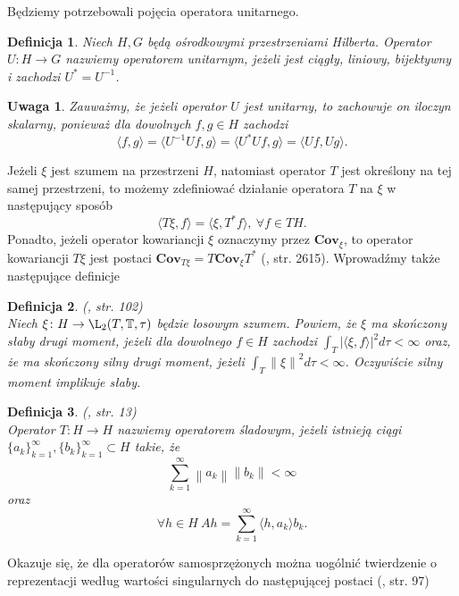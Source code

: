 \documentclass{mwart}
\newtheorem{df}{Definicja}
\newtheorem{uw}{Uwaga}
\newcommand{\norm}[1]{\left\lVert#1\right\rVert}
\begin{document}
Będziemy potrzebowali pojęcia operatora unitarnego.
\begin{df}
Niech $H,G$ będą ośrodkowymi przestrzeniami Hilberta. Operator $U\colon H\to G$ nazwiemy operatorem unitarnym, jeżeli jest ciągły, liniowy, bijektywny i zachodzi $U^*=U^{-1}$.
\end{df}
\begin{uw}
Zauważmy, że jeżeli operator $U$ jest unitarny, to zachowuje on iloczyn skalarny, ponieważ dla dowolnych $f,g\in H$ zachodzi
\begin{displaymath}
\langle f,g\rangle =\langle U^{-1}Uf,g\rangle =\langle U^*Uf,g\rangle =\langle Uf,Ug\rangle.
\end{displaymath}
\end{uw}
Jeżeli $\xi$ jest szumem na przestrzeni $H$, natomiast operator $T$ jest określony na tej samej przestrzeni, to możemy zdefiniować działanie operatora $T$ na $\xi$ w następujący sposób
\begin{displaymath}
\langle T\xi , f\rangle=\langle \xi, T^* f\rangle,\ \forall f\in TH.
\end{displaymath}
Ponadto, jeżeli operator kowariancji $\xi$ oznaczymy przez $\textbf{Cov}_{\xi}$, to operator kowariancji $T\xi$ jest postaci $\textbf{Cov}_{T\xi}=T\textbf{Cov}_{\xi}T^*$ (\cite{bissantz}, str. 2615). Wprowadźmy także następujące definicje
\begin{df}(\cite{typek}, str. 102)\\
Niech $\xi\colon H\to \L_2(T,\mathbb{T},\tau)$ będzie losowym szumem. Powiem, że $\xi$ ma skończony słaby drugi moment, jeżeli dla dowolnego $f\in H$ zachodzi $\int_T |\langle \xi, f\rangle |^2d\tau <\infty$ oraz, że ma skończony silny drugi moment, jeżeli $\int_T\norm{\xi}^2d\tau<\infty$. Oczywiście silny moment implikuje słaby.
\end{df}
\begin{df}(\cite{beska}, str. 13)\\
Operator $T\colon H\to H$  nazwiemy operatorem śladowym, jeżeli istnieją ciągi $\{a_k\}_{k=1}^{\infty},\{b_k\}_{k=1}^{\infty}\subset H$ takie, że
\begin{displaymath}
\sum_{k=1}^{\infty}\norm{a_k}\norm{b_k}<\infty
\end{displaymath}
oraz 
\begin{displaymath}
\forall h\in H\ Ah=\sum_{k=1}^{\infty}\langle h,a_k\rangle b_k.
\end{displaymath}
\end{df}
Okazuje się, że dla operatorów samosprzężonych można uogólnić twierdzenie o reprezentacji według wartości singularnych do następującej postaci (\cite{taylor}, str. 97)
\end{document}
